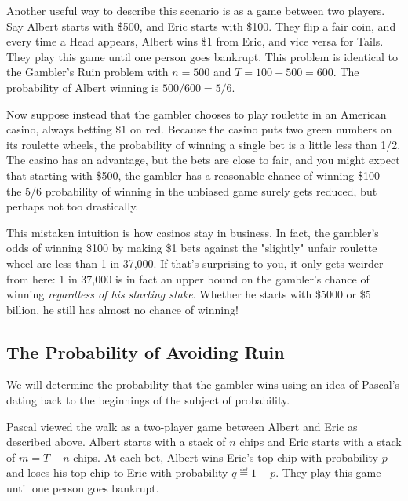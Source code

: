 Another useful way to describe this scenario is as a game between two
players.  Say Albert starts with \$500, and Eric starts with \$100.
They flip a fair coin, and every time a Head appears, Albert wins \$1
from Eric, and vice versa for Tails.  They play this game until one
person goes bankrupt.  This problem is identical to the Gambler's Ruin
problem with $n=500$ and $T=100+500=600$.  The probability of Albert
winning is $500/600 = 5/6$.\iffalse , namely, the ratio of his wealth
to the combined wealth.  Eric's chance of winning is $1/6$.\fi


Now suppose instead that the gambler chooses to play roulette in an
American casino, always betting \$1 on red.  Because the casino puts
two green numbers on its roulette wheels, the probability of winning a
single bet is \iffalse 18/38, which is just\fi a little less than 1/2.
The casino has an advantage, but the bets are close to fair, and you
might expect that starting with \$500, the gambler has a reasonable
chance of winning \$100---the 5/6 probability of winning in the
unbiased game surely gets reduced, but perhaps not too drastically.

This mistaken intuition is how casinos stay in business.  In fact, the
gambler's odds of winning \$100 by making \$1 bets against the
"slightly" unfair roulette wheel are less than 1 in 37,000.  If that's
surprising to you, it only gets weirder from here: 1 in 37,000 is in
fact an upper bound on the gambler's chance of winning
\emph{regardless of his starting stake}.  Whether he starts with
\$5000 or \$5 billion, he still has almost no chance of winning!

\subsection{The Probability of Avoiding Ruin}\label{prwinwalk_subsec}

We will determine the probability that the gambler wins using an idea
of Pascal's dating back to the beginnings of the subject of
probability.

Pascal viewed the walk as a two-player game between Albert and Eric as
described above.  Albert starts with a stack of $n$ chips and Eric
starts with a stack of $m = T-n$ chips.  At each bet, Albert wins
Eric's top chip with probability $p$ and loses his top chip to Eric
with probability $q \eqdef 1-p$.  They play this game until one
person goes bankrupt.

